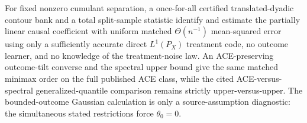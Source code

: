 For fixed nonzero cumulant separation, a once-for-all certified translated-dyadic contour bank and a total split-sample statistic identify and estimate the partially linear causal coefficient with uniform matched \(\Theta(n^{-1})\) mean-squared error using only a sufficiently accurate direct \(L^1(P_X)\) treatment code, no outcome learner, and no knowledge of the treatment-noise law. An ACE-preserving outcome-tilt converse and the spectral upper bound give the same matched minimax order on the full published ACE class, while the cited ACE-versus-spectral generalized-quantile comparison remains strictly upper-versus-upper. The bounded-outcome Gaussian calculation is only a source-assumption diagnostic: the simultaneous stated restrictions force \(\theta_0=0\).
